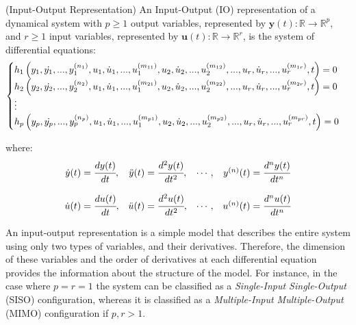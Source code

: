 \documentclass[a4paper,11pt]{book}
\numberwithin{figure}{chapter}
\numberwithin{equation}{chapter}
\numberwithin{table}{chapter}
\theoremstyle{definition}
\newtheorem{definition}{Definition}[chapter]
\newcounter{boxed-theorem}
\newcounter{boxed-definition}
\newenvironment{boxed-definition}[1]
{\begin{shaded} \begin{definition}{#1}}
{\end{definition} \end{shaded}}
\begin{document}
\begin{boxed-definition}{(Input-Output Representation)} \label{def:IORepr01}
	An Input-Output (IO) representation of a dynamical system with $p \geq 1$ output variables, represented by $\bm{y}(t) : \mathbb{R} \rightarrow \mathbb{R}^{p}$, and $r \geq 1$ input variables, represented by $\bm{u}(t) : \mathbb{R} \rightarrow \mathbb{R}^{r}$, is the system of differential equations:
	\begin{equation} \label{eq:IERepr01}
	\begin{cases}
		h_1 \left( y_1, \dot{y_1}, ..., y_1^{(n_1)}, u_1, \dot{u}_1, ..., u^{(m_{11})}_1, u_2, \dot{u}_2, ..., u^{(m_{12})}_2, ..., u_r, \dot{u}_r, ..., u^{(m_{1r})}_r, t   \right) = 0 & \\
		h_2 \left( y_2, \dot{y_2}, ..., y_2^{(n_2)}, u_1, \dot{u}_1, ..., u^{(m_{21})}_1, u_2, \dot{u}_2, ..., u^{(m_{22})}_2, ..., u_r, \dot{u}_r, ..., u^{(m_{2r})}_r, t   \right) = 0 & \\
		 \vdots \hfill & \\
		h_p \left( y_p, \dot{y_p}, ..., y_p^{(n_p)}, u_1, \dot{u}_1, ..., u^{(m_{p1})}_1, u_2, \dot{u}_2, ..., u^{(m_{p2})}_2, ..., u_r, \dot{u}_r, ..., u^{(m_{pr})}_r, t   \right) = 0 &
	\end{cases}
	\end{equation}
	
	\noindent where:
	\begin{equation*}
	\begin{matrix}
		\dot{y}(t) = \cfrac{d y(t)}{dt}, & \ddot{y}(t) = \cfrac{d^2 y(t)}{dt^2}, & \cdots, & y^{(n)}(t) = \cfrac{d^n y(t)}{dt^n} \\ \\
		\dot{u}(t) = \cfrac{d u(t)}{dt}, & \ddot{u}(t) = \cfrac{d^2 u(t)}{dt^2}, & \cdots, & u^{(n)}(t) = \cfrac{d^n u(t)}{dt^n}	
	\end{matrix}
	\end{equation*}
\end{boxed-definition}

An input-output representation is a simple model that describes the entire system using only two types of variables, and their derivatives. Therefore, the dimension of these variables and the order of derivatives at each differential equation provides the information about the structure of the model. For instance, in the case where $p = r = 1$ the system can be classified as a \textit{Single-Input Single-Output} (SISO) configuration, whereas it is classified as a \textit{Multiple-Input Multiple-Output} (MIMO) configuration if $p,r > 1$. 
\end{document}
